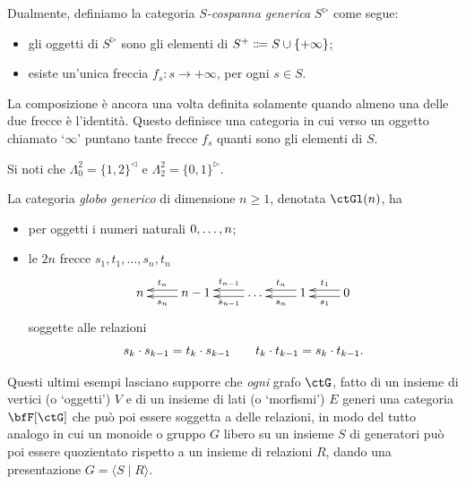 \begin{example}
 Dualmente, definiamo la categoria \emph{\(S\)-cospanna generica} \(S^\rhd\) come segue:
 \begin{itemize}
  \item gli oggetti di \(S^\rhd\) sono gli elementi di \(S^+ \defeq  S\cup \{+\infty\}\);
  \item esiste un'unica freccia \(f_s \colon s\to+\infty\), per ogni \(s\in S\).
 \end{itemize}
 La composizione è ancora una volta definita solamente quando almeno una delle due frecce è l'identità. Questo definisce una categoria in cui verso un oggetto chiamato `\(\infty\)' puntano tante frecce \(f_s\) quanti sono gli elementi di \(S\).

 Si noti che \(\Lambda^2_0=\{1,2\}^\lhd\) e \(\Lambda^2_2=\{0,1\}^\rhd\).
\end{example}
\begin{example}
 \label{ex_globo}
 La categoria \emph{globo generico} di dimensione \(n\ge 1\), denotata \(\ctGl(n)\), ha
 \begin{itemize}
  \item per oggetti i numeri naturali \(\iter[0]n\);
  \item le \(2n\) frecce \(s_1,t_1,\dots,s_n,t_n\)
        \[\xymatrix{
         n &\ar@<.25em>[l]^-{s_n}\ar@<-.25em>[l]_-{t_n} n-1 &\ar@<.25em>[l]^-{s_{n-1}}\ar@<-.25em>[l]_-{t_{n-1}} \dots &\ar@<.25em>[l]^-{s_n}\ar@<-.25em>[l]_-{t_n} 1 &\ar@<.25em>[l]^-{s_1}\ar@<-.25em>[l]_-{t_1} 0
         }\]
        soggette alle relazioni
        \[s_k\cdot s_{k-1} = t_k\cdot s_{k-1}\qquad t_k\cdot t_{k-1} = s_k\cdot t_{k-1}.\]
 \end{itemize}
\end{example}
Questi ultimi esempi lasciano supporre che \emph{ogni} grafo \(\ctG\), fatto di un insieme di vertici (o `oggetti') \(V\) e di un insieme di lati (o `morfismi') \(E\) generi una categoria \(\bfF[\ctG]\) che può poi essere soggetta a delle relazioni, in modo del tutto analogo in cui un monoide o gruppo \(G\) libero su un insieme \(S\) di generatori può poi essere quozientato rispetto a un insieme di relazioni \(R\), dando una presentazione \(G = \langle S\mid R\rangle\).

